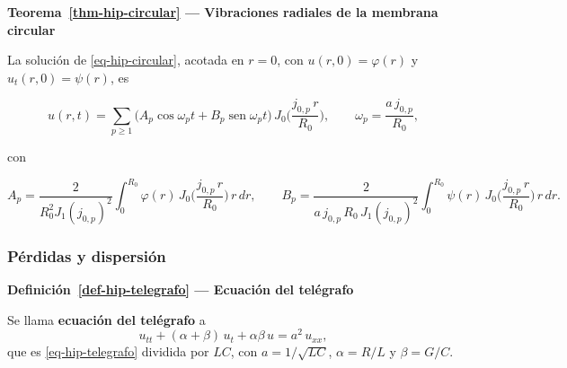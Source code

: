 \documentclass[
  spanish,
  a4paper,
]{scrbook}
\theoremstyle{definition}
\theoremstyle{plain}
\theoremstyle{definition}
\theoremstyle{plain}
\theoremstyle{definition}
\theoremstyle{remark}
\begin{document}
\begin{tcolorbox}[enhanced jigsaw, arc=.35mm, bottomrule=.15mm, breakable, colback=white, colframe=quarto-callout-note-color-frame, left=2mm, leftrule=.75mm, opacityback=0, rightrule=.15mm, toprule=.15mm]
\begin{minipage}[t]{5.5mm}
\textcolor{quarto-callout-note-color}{\faInfo}
\end{minipage}%
\begin{minipage}[t]{\textwidth - 5.5mm}

\vspace{-3mm}\textbf{Teorema~\ref{thm-hip-circular} --- Vibraciones radiales de la membrana
circular}\vspace{3mm}

La solución de \ref{eq-hip-circular}, acotada en \(r=0\), con
\(u(r,0) = \varphi(r)\) y \(u_t(r,0) = \psi(r)\), es

\[
u(r,t) = \sum_{p\ge1}\big(A_p\cos\omega_pt + B_p\operatorname{sen}\omega_pt\big)\,J_0\!\Big(\frac{j_{0,p}\,r}{R_0}\Big),
\qquad \omega_p = \frac{a\,j_{0,p}}{R_0},
\]

con

\[
A_p = \frac{2}{R_0^2J_1(j_{0,p})^2}\int_0^{R_0}\varphi(r)\,J_0\!\Big(\frac{j_{0,p}\,r}{R_0}\Big)\,r\,dr,
\qquad
B_p = \frac{2}{a\,j_{0,p}\,R_0\,J_1(j_{0,p})^2}\int_0^{R_0}\psi(r)\,J_0\!\Big(\frac{j_{0,p}\,r}{R_0}\Big)\,r\,dr .
\]

\end{minipage}%
\end{tcolorbox}

\subsubsection{Pérdidas y dispersión}\label{puxe9rdidas-y-dispersiuxf3n}

\begin{tcolorbox}[enhanced jigsaw, arc=.35mm, bottomrule=.15mm, breakable, colback=white, colframe=quarto-callout-note-color-frame, left=2mm, leftrule=.75mm, opacityback=0, rightrule=.15mm, toprule=.15mm]
\begin{minipage}[t]{5.5mm}
\textcolor{quarto-callout-note-color}{\faInfo}
\end{minipage}%
\begin{minipage}[t]{\textwidth - 5.5mm}

\vspace{-3mm}\textbf{Definición~\ref{def-hip-telegrafo} --- Ecuación del telégrafo}\vspace{3mm}

Se llama \textbf{ecuación del telégrafo} a \[
u_{tt} + (\alpha+\beta)\,u_t + \alpha\beta\,u = a^2\,u_{xx},
\] que es \ref{eq-hip-telegrafo} dividida por \(LC\), con
\(a = 1/\sqrt{LC}\), \(\alpha = R/L\) y \(\beta = G/C\).

\end{minipage}%
\end{tcolorbox}
\end{document}

